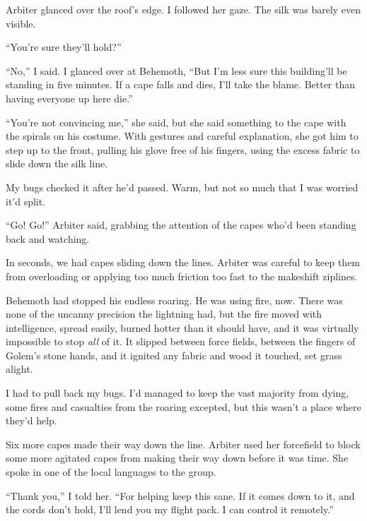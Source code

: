 Arbiter glanced over the roof's edge.  I followed her gaze.  The silk was barely even visible.



``You're sure they'll hold?''



``No,'' I said.  I glanced over at Behemoth, ``But I'm less sure this building'll be standing in five minutes.  If a cape falls and dies, I'll take the blame.  Better than having everyone up here die.''



``You're not convincing me,'' she said, but she said something to the cape with the spirals on his costume.  With gestures and careful explanation, she got him to step up to the front, pulling his glove free of his fingers, using the excess fabric to slide down the silk line.



My bugs checked it after he'd passed.  Warm, but not so much that I was worried it'd split.



``Go!  Go!''  Arbiter said, grabbing the attention of the capes who'd been standing back and watching.



In seconds, we had capes sliding down the lines.  Arbiter was careful to keep them from overloading or applying too much friction too fast to the makeshift ziplines.



Behemoth had stopped his endless roaring.  He was using fire, now.  There was none of the uncanny precision the lightning had, but the fire moved with intelligence, spread easily, burned hotter than it should have, and it was virtually impossible to stop \emph{all} of it.  It slipped between force fields, between the fingers of Golem's stone hands, and it ignited any fabric and wood it touched, set grass alight.



I had to pull back my bugs.  I'd managed to keep the vast majority from dying, some fires and casualties from the roaring excepted, but this wasn't a place where they'd help.



Six more capes made their way down the line.  Arbiter used her forcefield to block some more agitated capes from making their way down before it was time.  She spoke in one of the local languages to the group.



``Thank you,'' I told her.  ``For helping keep this sane.  If it comes down to it, and the cords don't hold, I'll lend you my flight pack.  I can control it remotely.''



